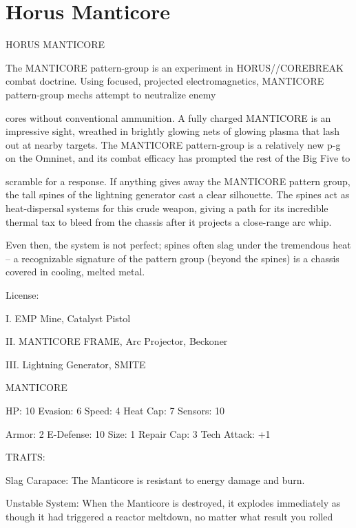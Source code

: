 \section{Horus Manticore}

                                        HORUS MANTICORE

The MANTICORE pattern-group is an experiment in HORUS//COREBREAK combat doctrine. Using
focused, projected electromagnetics, MANTICORE pattern-group mechs attempt to neutralize enemy

cores without conventional ammunition. A fully charged MANTICORE is an impressive sight, wreathed in
brightly glowing nets of glowing plasma that lash out at nearby targets. The MANTICORE pattern-group is
a relatively new p-g on the Omninet, and its combat efficacy has prompted the rest of the Big Five to

scramble for a response. If anything gives away the MANTICORE pattern group, the tall spines of the
lightning generator cast a clear silhouette. The spines act as heat-dispersal systems for this crude weapon,
giving a path for its incredible thermal tax to bleed from the chassis after it projects a close-range arc whip.

Even then, the system is not perfect; spines often slag under the tremendous heat -- a recognizable
signature of the pattern group (beyond the spines) is a chassis covered in cooling, melted metal.

                                                    License:

I. EMP Mine, Catalyst Pistol

II. MANTICORE FRAME, Arc Projector, Beckoner

III. Lightning Generator, SMITE


                                                MANTICORE

 HP: 10          Evasion: 6                            Speed: 4            Heat Cap: 7        Sensors: 10

 Armor: 2        E-Defense: 10                         Size: 1             Repair Cap: 3      Tech Attack:
                                                                                              +1

                                                    TRAITS:

 Slag Carapace: The Manticore is resistant to energy damage and burn.

 Unstable System: When the Manticore is destroyed, it explodes immediately as though it had triggered
 a reactor meltdown, no matter what result you rolled

